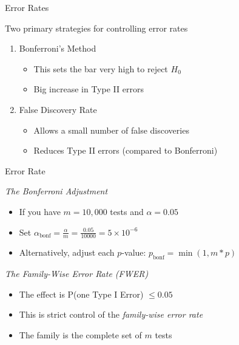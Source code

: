\documentclass[aspectratio=169,11pt]{beamer}
\begin{document}
\begin{frame}{Error Rates}

Two primary strategies for controlling error rates\\[5mm]

	\begin{enumerate}
		\item Bonferroni's Method
		\begin{itemize}
			\item This sets the bar very high to reject $H_0$
			\item Big increase in Type II errors
		\end{itemize}
		\item False Discovery Rate
		\begin{itemize}
			\item Allows a small number of false discoveries
			\item Reduces Type II errors (compared to Bonferroni)
		\end{itemize}
	\end{enumerate}


\end{frame}

\begin{frame}{Error Rate}

\textit{The Bonferroni Adjustment}

	\begin{itemize}
		\item If you have $m = 10,000$ tests and $\alpha = 0.05$
		\item Set $\alpha_{\text{bonf}} = \frac{\alpha}{m} = \frac{0.05}{10000} = 5\times10^{-6}$
		\item Alternatively, adjust each $p$-value: $p_{\text{bonf}} = \min(1, m*p)$\\[4mm]
	\end{itemize}

\pause
\textit{The Family-Wise Error Rate (FWER)}\\

	\begin{itemize}
		\item The effect is P(one Type I Error) $\leq 0.05$
		\item This is strict control of the \textit{family-wise error rate}
		\item The family is the complete set of $m$ tests
	\end{itemize}

\end{frame}
\end{document}
